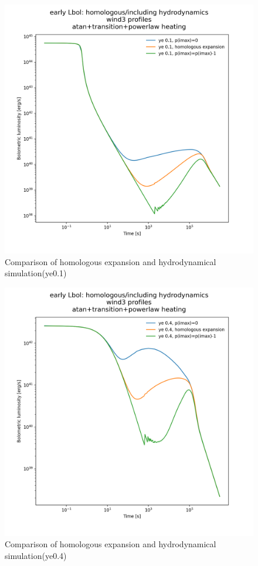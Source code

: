 \documentclass[fleqn,usenatbib]{mnras}
\begin{document}
\begin{figure}
\centering
\includegraphics[scale=0.3]{figures/boundary/earlyLC_wind3ye0.1_atp_zb_cb_homologous.png}
\caption{Comparison of homologous expansion and hydrodynamical simulation(ye0.1)}
\label{homologous_ye0.1}
\end{figure}

\begin{figure}
\centering
\includegraphics[scale=0.3]{figures/boundary/earlyLC_wind3ye0.4_atp_zb_cb_homologous.png}
\caption{Comparison of homologous expansion and hydrodynamical simulation(ye0.4)}
\label{homologous_ye0.4}
\end{figure}
\end{document}
